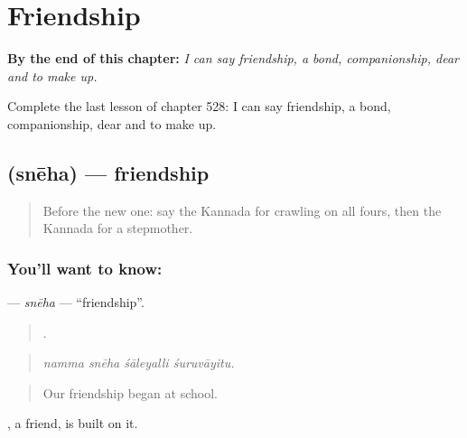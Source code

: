 
\chapter{Friendship}
\label{ch:ka-friendship}

\begin{chapteropening}
\textbf{By the end of this chapter:} \emph{I can say friendship, a bond, companionship, dear and to make up.}

Complete the last lesson of chapter 528: I can say friendship, a bond, companionship, dear and to make up.
\end{chapteropening}

\section[\texorpdfstring{\kn{ಸ್ನೇಹ} (snēha)}{ಸ್ನೇಹ (snēha)}]{ (snēha) — friendship}

\label{lesson:KA-C528-sneha}



\begin{quote}
Before the new one: say the Kannada for crawling on all fours, then the Kannada for a stepmother.
\end{quote}

\subsection*{You'll want to know: }
\textbf{} — \emph{snēha} — \textquotedblleft{}friendship\textquotedblright{}.

\begin{quote}
   .
\end{quote}

\begin{quote}
\emph{namma snēha śāleyalli śuruvāyitu.}
\end{quote}

\begin{quote}
Our friendship began at school.
\end{quote}

, a friend, is built on it.

